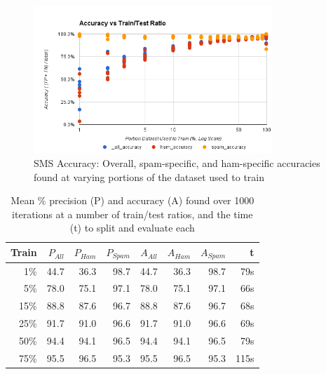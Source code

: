 \begin{figure}[ht!]
    \centering
    \includegraphics[width=90mm]{img/sms_basic-accuracy.png}
    \caption{SMS Accuracy: Overall, spam-specific, and ham-specific accuracies found at varying portions of the dataset used to train}
    \label{fig:smsBasicAccuracy}
\end{figure}

\begin{table}
    \begin{tabular}{rrrrrrrr}
        \hline
        \textbf{Train} &
        \textbf{\begin{math}P_{All}\end{math}} & \textbf{\begin{math}P_{Ham}\end{math}} & \textbf{\begin{math}P_{Spam}\end{math}} &
        \textbf{\begin{math}A_{All}\end{math}} & \textbf{\begin{math}A_{Ham}\end{math}} & \textbf{\begin{math}A_{Spam}\end{math}} &
        \textbf{t} \\ [0.5ex]
        \hline\hline
        1\%  & 44.7 & 36.3 & 98.7 & 44.7 & 36.3 & 98.7 & 79s \\
        5\%  & 78.0 & 75.1 & 97.1 & 78.0 & 75.1 & 97.1 & 66s \\
        15\% & 88.8 & 87.6 & 96.7 & 88.8 & 87.6 & 96.7 & 68s \\
        25\% & 91.7 & 91.0 & 96.6 & 91.7 & 91.0 & 96.6 & 69s \\
        50\% & 94.4 & 94.1 & 96.5 & 94.4 & 94.1 & 96.5 & 79s \\
        75\% & 95.5 & 96.5 & 95.3 & 95.5 & 96.5 & 95.3 & 115s \\
        \hline
    \end{tabular}
    \caption{Mean \% precision (P) and accuracy (A) found over 1000 iterations at a number of train/test ratios,
    and the time (t) to split and evaluate each}
    \label{table:smsBasicResults}
\end{table}

